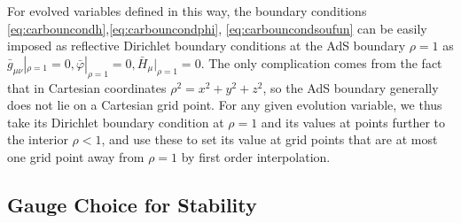 \documentclass[a4paper,11pt]{article}
\begin{document}

For evolved variables defined in this way, the boundary conditions \eqref{eq:carbouncondh},\eqref{eq:carbouncondphi}, \eqref{eq:carbouncondsoufun} can be easily imposed as reflective Dirichlet boundary conditions at the AdS boundary $\rho=1$ as $\bar{g}_{\mu\nu}|_{\rho=1}=0,\bar{\varphi}|_{\rho=1}=0,\bar{H}_\mu|_{\rho=1}=0$.
The only complication comes from the fact that in Cartesian coordinates $\rho^2=x^2+y^2+z^2$, so the AdS boundary generally does not lie on a Cartesian grid point. 
For any given evolution variable, we thus take its Dirichlet boundary condition at $\rho=1$ and its values at points further to the interior $\rho<1$, and use these to set its value at grid points that are at most one grid point away from $\rho=1$ by first order interpolation.


\subsection{Gauge Choice for Stability}\label{sec:gauge_choice}
\end{document}

